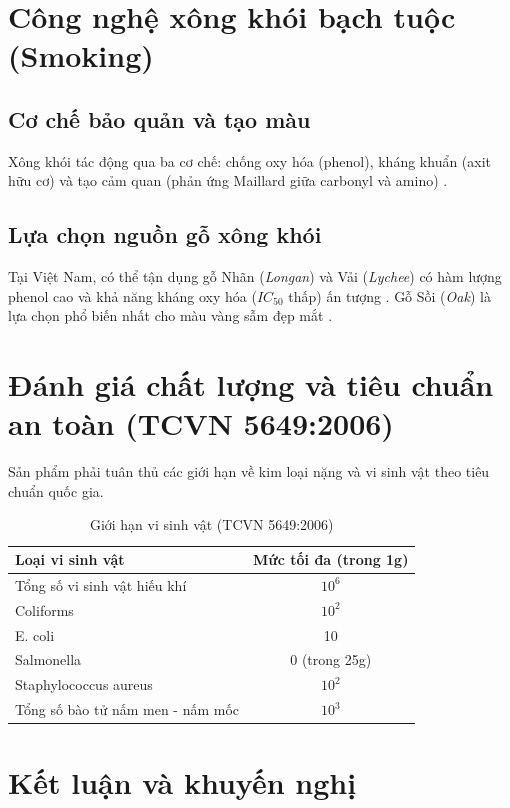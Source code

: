 \documentclass[12pt,a4paper]{report}
\begin{document}
\section{Công nghệ xông khói bạch tuộc (Smoking)}

\subsection{Cơ chế bảo quản và tạo màu}

Xông khói tác động qua ba cơ chế: chống oxy hóa (phenol), kháng khuẩn (axit hữu cơ) và tạo cảm quan (phản ứng Maillard giữa carbonyl và amino) \cite{smoke_antioxidant, hun_khoi_ky_thuat}.

\subsection{Lựa chọn nguồn gỗ xông khói}

Tại Việt Nam, có thể tận dụng gỗ Nhãn (\textit{Longan}) và Vải (\textit{Lychee}) có hàm lượng phenol cao và khả năng kháng oxy hóa ($IC_{50}$ thấp) ấn tượng \cite{lychee_pulp}. Gỗ Sồi (\textit{Oak}) là lựa chọn phổ biến nhất cho màu vàng sẫm đẹp mắt \cite{go_soi_xong_khoi}.

\section{Đánh giá chất lượng và tiêu chuẩn an toàn (TCVN 5649:2006)}

Sản phẩm phải tuân thủ các giới hạn về kim loại nặng và vi sinh vật theo tiêu chuẩn quốc gia.

\begin{table}[H]
	\centering
	\caption{Giới hạn vi sinh vật (TCVN 5649:2006)}
	\begin{tabular}{lc}
		\toprule
		\textbf{Loại vi sinh vật} & \textbf{Mức tối đa (trong 1g)} \\
		\midrule
		Tổng số vi sinh vật hiếu khí & $10^6$ \\
		Coliforms & $10^2$ \\
		E. coli & 10 \\
		Salmonella & 0 (trong 25g) \\
		Staphylococcus aureus & $10^2$ \\
		Tổng số bào tử nấm men - nấm mốc & $10^3$ \\
		\bottomrule
	\end{tabular}
\end{table}

\section{Kết luận và khuyến nghị}
\end{document}
